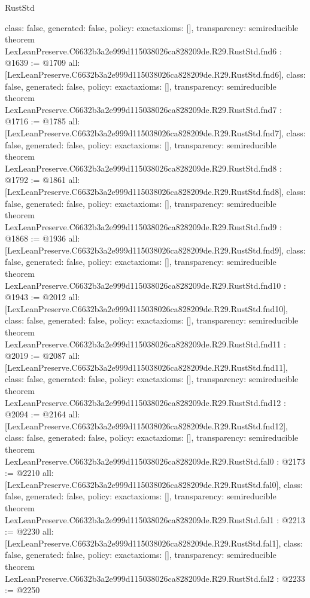\begin{lexlean}{RustStd}
\begin{coremodule}
{  class: false,
  generated: false,
  policy: exact{axioms: []},
  transparency: semireducible
}
theorem LexLeanPreserve.C6632b3a2e999d115038026ca828209de.R29.RustStd.fnd6 : @1639 := @1709 {
  all: [LexLeanPreserve.C6632b3a2e999d115038026ca828209de.R29.RustStd.fnd6],
  class: false,
  generated: false,
  policy: exact{axioms: []},
  transparency: semireducible
}
theorem LexLeanPreserve.C6632b3a2e999d115038026ca828209de.R29.RustStd.fnd7 : @1716 := @1785 {
  all: [LexLeanPreserve.C6632b3a2e999d115038026ca828209de.R29.RustStd.fnd7],
  class: false,
  generated: false,
  policy: exact{axioms: []},
  transparency: semireducible
}
theorem LexLeanPreserve.C6632b3a2e999d115038026ca828209de.R29.RustStd.fnd8 : @1792 := @1861 {
  all: [LexLeanPreserve.C6632b3a2e999d115038026ca828209de.R29.RustStd.fnd8],
  class: false,
  generated: false,
  policy: exact{axioms: []},
  transparency: semireducible
}
theorem LexLeanPreserve.C6632b3a2e999d115038026ca828209de.R29.RustStd.fnd9 : @1868 := @1936 {
  all: [LexLeanPreserve.C6632b3a2e999d115038026ca828209de.R29.RustStd.fnd9],
  class: false,
  generated: false,
  policy: exact{axioms: []},
  transparency: semireducible
}
theorem LexLeanPreserve.C6632b3a2e999d115038026ca828209de.R29.RustStd.fnd10 : @1943 := @2012 {
  all: [LexLeanPreserve.C6632b3a2e999d115038026ca828209de.R29.RustStd.fnd10],
  class: false,
  generated: false,
  policy: exact{axioms: []},
  transparency: semireducible
}
theorem LexLeanPreserve.C6632b3a2e999d115038026ca828209de.R29.RustStd.fnd11 : @2019 := @2087 {
  all: [LexLeanPreserve.C6632b3a2e999d115038026ca828209de.R29.RustStd.fnd11],
  class: false,
  generated: false,
  policy: exact{axioms: []},
  transparency: semireducible
}
theorem LexLeanPreserve.C6632b3a2e999d115038026ca828209de.R29.RustStd.fnd12 : @2094 := @2164 {
  all: [LexLeanPreserve.C6632b3a2e999d115038026ca828209de.R29.RustStd.fnd12],
  class: false,
  generated: false,
  policy: exact{axioms: []},
  transparency: semireducible
}
theorem LexLeanPreserve.C6632b3a2e999d115038026ca828209de.R29.RustStd.fal0 : @2173 := @2210 {
  all: [LexLeanPreserve.C6632b3a2e999d115038026ca828209de.R29.RustStd.fal0],
  class: false,
  generated: false,
  policy: exact{axioms: []},
  transparency: semireducible
}
theorem LexLeanPreserve.C6632b3a2e999d115038026ca828209de.R29.RustStd.fal1 : @2213 := @2230 {
  all: [LexLeanPreserve.C6632b3a2e999d115038026ca828209de.R29.RustStd.fal1],
  class: false,
  generated: false,
  policy: exact{axioms: []},
  transparency: semireducible
}
theorem LexLeanPreserve.C6632b3a2e999d115038026ca828209de.R29.RustStd.fal2 : @2233 := @2250 {
}
\end{coremodule}
\end{lexlean}
